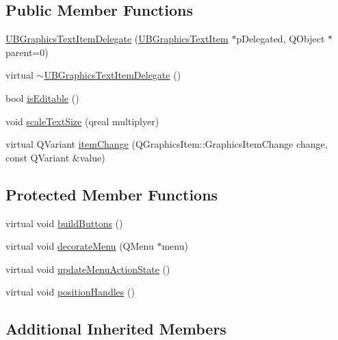 \subsection*{Public Member Functions}
\begin{DoxyCompactItemize}
\item 
\hyperlink{class_u_b_graphics_text_item_delegate_a8e216ad171c1c7216732b7e266fe785e}{U\-B\-Graphics\-Text\-Item\-Delegate} (\hyperlink{class_u_b_graphics_text_item}{U\-B\-Graphics\-Text\-Item} $\ast$p\-Delegated, Q\-Object $\ast$parent=0)
\item 
virtual \hyperlink{class_u_b_graphics_text_item_delegate_a8e653f904e398465939a70bf78205544}{$\sim$\-U\-B\-Graphics\-Text\-Item\-Delegate} ()
\item 
bool \hyperlink{class_u_b_graphics_text_item_delegate_ac7b1a97796fd1c07b61d5aa900020573}{is\-Editable} ()
\item 
void \hyperlink{class_u_b_graphics_text_item_delegate_a31031f4a0ecc99956015db236d973ac6}{scale\-Text\-Size} (qreal multiplyer)
\item 
virtual Q\-Variant \hyperlink{class_u_b_graphics_text_item_delegate_ab61402d03cd4a7cc467a21c583aa16fa}{item\-Change} (Q\-Graphics\-Item\-::\-Graphics\-Item\-Change change, const Q\-Variant \&value)
\end{DoxyCompactItemize}
\subsection*{Protected Member Functions}
\begin{DoxyCompactItemize}
\item 
virtual void \hyperlink{class_u_b_graphics_text_item_delegate_aed68d84ee8c86411f7b9197a4220e18f}{build\-Buttons} ()
\item 
virtual void \hyperlink{class_u_b_graphics_text_item_delegate_a50aee9dacc7199cbea2b7e1d1fd06a18}{decorate\-Menu} (Q\-Menu $\ast$menu)
\item 
virtual void \hyperlink{class_u_b_graphics_text_item_delegate_a63f892bf8e8b39d2f8449b0ee45f6ca4}{update\-Menu\-Action\-State} ()
\item 
virtual void \hyperlink{class_u_b_graphics_text_item_delegate_a7ecdc3b3ed05e772714e7bb461de779f}{position\-Handles} ()
\end{DoxyCompactItemize}
\subsection*{Additional Inherited Members}


